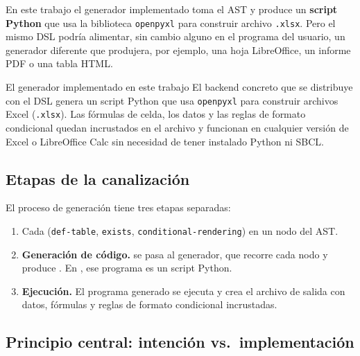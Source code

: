 \documentclass[12pt,a4paper]{report}
\begin{document}
En este trabajo el generador implementado toma el AST y produce un
\textbf{script Python} que usa la biblioteca \texttt{openpyxl} para
construir  archivo \texttt{.xlsx}.  Pero el mismo DSL podría alimentar,
sin cambio alguno en el programa del usuario, un generador diferente que
produjera, por ejemplo, una hoja LibreOffice, un informe PDF o una tabla
HTML.

\begin{infobox}{El generador implementado en este trabajo}
El backend concreto que se distribuye con el DSL genera un script Python
que usa \texttt{openpyxl} para construir archivos Excel (\texttt{.xlsx}).
Las fórmulas de celda, los datos y las reglas de formato condicional quedan
incrustados en el archivo y funcionan en cualquier versión de Excel o
LibreOffice Calc sin necesidad de tener instalado Python ni SBCL.
\end{infobox}

\subsection{Etapas de la canalización}


El proceso de generación tiene tres etapas  separadas:

\begin{enumerate}
    \item {}  Cada  (\texttt{def-table}, \texttt{exists},
  \texttt{conditional-rendering})  en un nodo del AST.

    \item \textbf{Generación de código.}   se pasa al generador, que recorre cada nodo y produce
  .  En , ese programa es un script Python.

  \item \textbf{Ejecución.}  El programa generado se ejecuta y crea el
    archivo de salida con datos, fórmulas y reglas de formato condicional
    incrustadas.
\end{enumerate}


\subsection{Principio central: intención vs.\ implementación}
\end{document}
